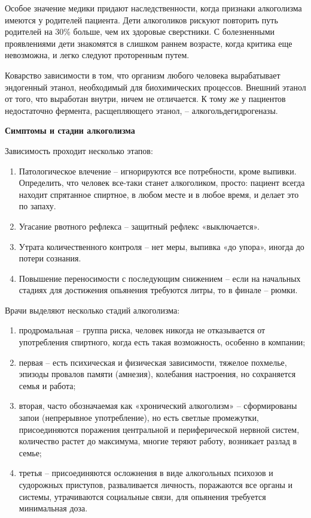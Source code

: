 Особое значение медики придают наследственности, когда признаки алкоголизма имеются у родителей пациента. Дети алкоголиков рискуют повторить путь родителей на 30\% больше, чем их здоровые сверстники. С болезненными проявлениями дети знакомятся в слишком раннем возрасте, когда критика еще невозможна, и легко следуют проторенным путем.

Коварство зависимости в том, что организм любого человека вырабатывает эндогенный этанол, необходимый для биохимических процессов. Внешний этанол от того, что выработан внутри, ничем не отличается. К тому же у пациентов недостаточно фермента, расщепляющего этанол, – алкогольдегидрогеназы.

\textbf{Симптомы и стадии алкоголизма}

Зависимость проходит несколько этапов:
\begin{enumerate}
    \item Патологическое влечение – игнорируются все потребности, кроме выпивки. Определить, что человек все-таки станет алкоголиком, просто: пациент всегда находит спрятанное спиртное, в любом месте и в любое время, и делает это по запаху.
    \item Угасание рвотного рефлекса – защитный рефлекс «выключается».
    \item Утрата количественного контроля – нет меры, выпивка «до упора», иногда до потери сознания.
    \item Повышение переносимости с последующим снижением – если на начальных стадиях для достижения опьянения требуются литры, то в финале – рюмки.
\end{enumerate}

Врачи выделяют несколько стадий алкоголизма:
\begin{enumerate}
    \item продромальная – группа риска, человек никогда не отказывается от употребления спиртного, когда есть такая возможность, особенно в компании;
    \item первая – есть психическая и физическая зависимости, тяжелое похмелье, эпизоды провалов памяти (амнезия), колебания настроения, но сохраняется семья и работа;
    \item вторая, часто обозначаемая как «хронический алкоголизм» – сформированы запои (непрерывное употребление), но есть светлые промежутки, присоединяются поражения центральной и периферической нервной систем, количество растет до максимума, многие теряют работу, возникает разлад в семье;
    \item третья – присоединяются осложнения в виде алкогольных психозов и судорожных приступов, разваливается личность, поражаются все органы и системы, утрачиваются социальные связи, для опьянения требуется минимальная доза.
\end{enumerate}

